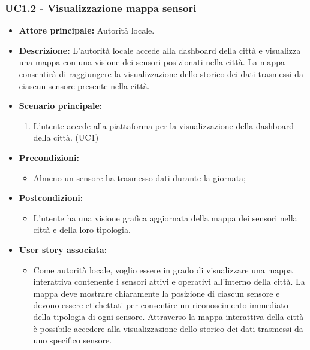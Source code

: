 \subsubsection{UC1.2 - Visualizzazione mappa sensori}
\begin{itemize}
    \item \textbf{Attore principale:} Autorità locale.
    \item \textbf{Descrizione:} L'autorità locale accede alla dashboard della città e visualizza una mappa con una visione dei sensori posizionati nella città. 
    La mappa consentirà di raggiungere la visualizzazione dello storico dei dati trasmessi da ciascun sensore presente nella città.
    \item \textbf{Scenario principale:}
        \begin{enumerate}
            \item L'utente accede alla piattaforma per la visualizzazione della dashboard della città. (UC1)
        \end{enumerate}
    \item \textbf{Precondizioni:}
        \begin{itemize}
            \item  Almeno un sensore ha trasmesso dati durante la giornata;
        \end{itemize}
    \item \textbf{Postcondizioni:}
        \begin{itemize}
            \item L'utente ha una visione grafica aggiornata della mappa dei sensori nella città e della loro tipologia.
        \end{itemize}
    \item \textbf{User story associata:}
        \begin{itemize}
            \item Come autorità locale, voglio essere in grado di visualizzare una mappa interattiva contenente i sensori attivi e operativi all'interno della città. La mappa deve mostrare chiaramente la posizione di ciascun sensore e devono essere etichettati per consentire un riconoscimento immediato della tipologia di ogni sensore.
            Attraverso la mappa interattiva della città è possibile accedere alla visualizzazione dello storico dei dati trasmessi da uno specifico sensore.
        \end{itemize}
\end{itemize}
